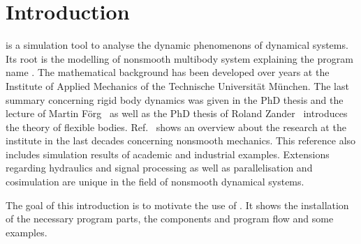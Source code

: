\section{Introduction}
\MBSim{} is a simulation tool to analyse the dynamic phenomenons of dynamical systems. Its root is the modelling of nonsmooth multibody system explaining the program name \MBSim{}. The mathematical background has been developed over years at the Institute of Applied Mechanics of the Technische Universit\"at M\"unchen. The last summary concerning rigid body dynamics was given in the PhD thesis and the lecture of Martin F\"org~\cite{Foer06,Foer07} as well as the PhD thesis of Roland Zander~\cite{Zan08a} introduces the theory of flexible bodies. Ref.~\cite{Zan08} shows an overview about the research at the institute in the last decades concerning nonsmooth mechanics. This reference also includes simulation results of academic and industrial examples. Extensions regarding hydraulics and signal processing as well as parallelisation and cosimulation are unique in the field of nonsmooth dynamical systems.\par
The goal of this introduction is to motivate the use of \MBSim{}. It shows the installation of the necessary program parts, the components and program flow and some examples. 

